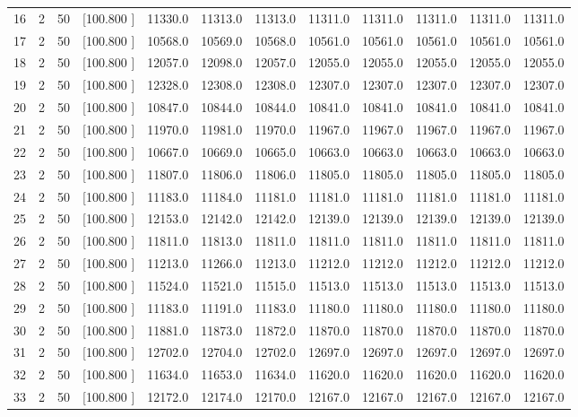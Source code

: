 \documentclass[12pt,a4paper]{article}
\begin{document}
\begin{center}
{\begin{tabular}{r r r r r r r r r r r r}
  16&  2& 50&[100.800   ]& 11330.0& 11313.0& 11313.0& 11311.0& 11311.0& 11311.0& 11311.0& 11311.0\\[-0.02in]
  17&  2& 50&[100.800   ]& 10568.0& 10569.0& 10568.0& 10561.0& 10561.0& 10561.0& 10561.0& 10561.0\\[-0.02in]
  18&  2& 50&[100.800   ]& 12057.0& 12098.0& 12057.0& 12055.0& 12055.0& 12055.0& 12055.0& 12055.0\\[-0.02in]
  19&  2& 50&[100.800   ]& 12328.0& 12308.0& 12308.0& 12307.0& 12307.0& 12307.0& 12307.0& 12307.0\\[-0.02in]
  20&  2& 50&[100.800   ]& 10847.0& 10844.0& 10844.0& 10841.0& 10841.0& 10841.0& 10841.0& 10841.0\\[-0.02in]
  21&  2& 50&[100.800   ]& 11970.0& 11981.0& 11970.0& 11967.0& 11967.0& 11967.0& 11967.0& 11967.0\\[-0.02in]
  22&  2& 50&[100.800   ]& 10667.0& 10669.0& 10665.0& 10663.0& 10663.0& 10663.0& 10663.0& 10663.0\\[-0.02in]
  23&  2& 50&[100.800   ]& 11807.0& 11806.0& 11806.0& 11805.0& 11805.0& 11805.0& 11805.0& 11805.0\\[-0.02in]
  24&  2& 50&[100.800   ]& 11183.0& 11184.0& 11181.0& 11181.0& 11181.0& 11181.0& 11181.0& 11181.0\\[-0.02in]
  25&  2& 50&[100.800   ]& 12153.0& 12142.0& 12142.0& 12139.0& 12139.0& 12139.0& 12139.0& 12139.0\\[-0.02in]
  26&  2& 50&[100.800   ]& 11811.0& 11813.0& 11811.0& 11811.0& 11811.0& 11811.0& 11811.0& 11811.0\\[-0.02in]
  27&  2& 50&[100.800   ]& 11213.0& 11266.0& 11213.0& 11212.0& 11212.0& 11212.0& 11212.0& 11212.0\\[-0.02in]
  28&  2& 50&[100.800   ]& 11524.0& 11521.0& 11515.0& 11513.0& 11513.0& 11513.0& 11513.0& 11513.0\\[-0.02in]
  29&  2& 50&[100.800   ]& 11183.0& 11191.0& 11183.0& 11180.0& 11180.0& 11180.0& 11180.0& 11180.0\\[-0.02in]
  30&  2& 50&[100.800   ]& 11881.0& 11873.0& 11872.0& 11870.0& 11870.0& 11870.0& 11870.0& 11870.0\\[-0.02in]
  31&  2& 50&[100.800   ]& 12702.0& 12704.0& 12702.0& 12697.0& 12697.0& 12697.0& 12697.0& 12697.0\\[-0.02in]
  32&  2& 50&[100.800   ]& 11634.0& 11653.0& 11634.0& 11620.0& 11620.0& 11620.0& 11620.0& 11620.0\\[-0.02in]
  33&  2& 50&[100.800   ]& 12172.0& 12174.0& 12170.0& 12167.0& 12167.0& 12167.0& 12167.0& 12167.0\\[-0.02in]

\end{tabular}}
\end{center}
\end{document}
